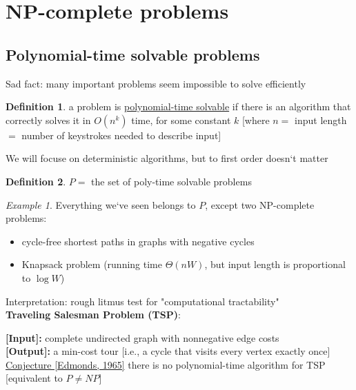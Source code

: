 \documentclass[a4paper,12pt]{article}
\theoremstyle{plain}
\theoremstyle{definition}
\newtheorem*{definition}{Definition}
\theoremstyle{remark}
\newtheorem*{example}{Example}
\begin{document}
\newpage
\section{NP-complete problems}



\subsection{Polynomial-time solvable problems}
Sad fact: many important problems seem impossible to solve efficiently

\begin{definition}
a problem is \underline{polynomial-time solvable} if there is an algorithm that correctly solves it in $O(n^k)$ time, for some constant $k$ [where $n =$ input length $=$ number of keystrokes needed to describe input]
\end{definition}

We will focuse on deterministic algorithms, but to first order doesn`t matter

\begin{definition}
$P =$ the set of poly-time solvable problems
\end{definition}

\begin{example}
Everything we`ve seen belongs to $P$, except two NP-complete problems:
\begin{itemize}
	\item cycle-free shortest paths in graphs with negative cycles
	\item Knapsack problem (running time $\Theta(nW)$, but input length is proportional to $\log W$)
\end{itemize}
\end{example}

Interpretation: rough litmus test for "computational tractability"
\\

\textbf{Traveling Salesman Problem (TSP)}:

\textbf{[Input]:} complete undirected graph with nonnegative edge costs
\\

\textbf{[Output]:} a min-cost tour [i.e., a cycle that visits every vertex exactly once]
\\

\underline{Conjecture [Edmonds, 1965]} there is no polynomial-time algorithm for TSP [equivalent to $P \neq NP$]
\\
\end{document}
